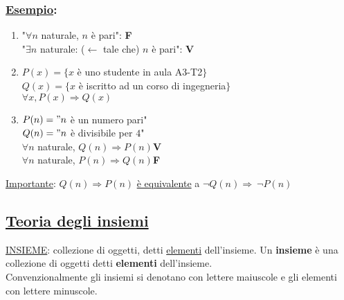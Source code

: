 \documentclass{article}
\newcommand{\ul}[1]{\underline{#1}}
\newcommand{\Esempio}[1]{\subsubsection*{\ul{Esempio}:}#1}
\begin{document}
\Esempio{
	\begin{enumerate}
		\item "$\forall n$ naturale, $n$ è pari": \textbf{\color{red}F}\\
		      "$\exists n$ naturale: ($\leftarrow$ tale che) $n$ è pari": \textbf{\color{green}V}
		\item $P(x)=\{x$ è uno studente in aula A3-T2$\}$\\
		      $Q(x)=\{x$ è iscritto ad un corso di ingegneria$\}$\\
		      $\forall x, P(x)\Rightarrow Q(x)$
		\item $P(n)="n$ è un numero pari"\\
		      $Q(n)="n$ è divisibile per $4$"\\
		      $\forall n$ naturale, $Q(n)\Rightarrow P(n)$\textbf{\color{green}V}\\
		      $\forall n$ naturale, $P(n)\Rightarrow Q(n)$\textbf{\color{red}F}\\
	\end{enumerate}
	\ul{Importante}: $Q(n)\Rightarrow P(n)$ \ul{è equivalente} a $\neg Q(n)\Rightarrow\ \neg P(n)$
}

\subsection{\color{blue}\ul{Teoria degli insiemi}}
\ul{INSIEME}: collezione di oggetti, detti \ul{elementi} dell'insieme.
Un \textbf{insieme} è una collezione di oggetti detti \textbf{elementi} dell'insieme.\\
Convenzionalmente gli insiemi si denotano con lettere maiuscole e gli elementi con lettere minuscole.
\end{document}
